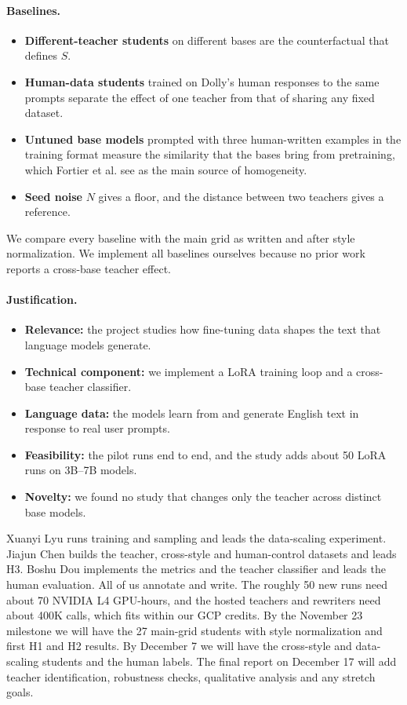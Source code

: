 \documentclass{article}
\begin{document}
\paragraph{Baselines.}
\begin{itemize}
    \item \textbf{Different-teacher students} on different bases are the counterfactual that defines $S$.
    \item \textbf{Human-data students} trained on Dolly's human responses to the same prompts separate the effect of one teacher from that of sharing any fixed dataset.
    \item \textbf{Untuned base models} prompted with three human-written examples in the training format measure the similarity that the bases bring from pretraining, which Fortier et al. see as the main source of homogeneity.
    \item \textbf{Seed noise} $N$ gives a floor, and the distance between two teachers gives a reference.
\end{itemize}
We compare every baseline with the main grid as written and after style normalization. We implement all baselines ourselves because no prior work reports a cross-base teacher effect.

\paragraph{Justification.}
\begin{itemize}
    \item \textbf{Relevance:} the project studies how fine-tuning data shapes the text that language models generate.
    \item \textbf{Technical component:} we implement a LoRA training loop and a cross-base teacher classifier.
    \item \textbf{Language data:} the models learn from and generate English text in response to real user prompts.
    \item \textbf{Feasibility:} the pilot runs end to end, and the study adds about 50 LoRA runs on 3B--7B models.
    \item \textbf{Novelty:} we found no study that changes only the teacher across distinct base models.
\end{itemize}
Xuanyi Lyu runs training and sampling and leads the data-scaling experiment. Jiajun Chen builds the teacher, cross-style and human-control datasets and leads H3. Boshu Dou implements the metrics and the teacher classifier and leads the human evaluation. All of us annotate and write. The roughly 50 new runs need about 70 NVIDIA L4 GPU-hours, and the hosted teachers and rewriters need about 400K calls, which fits within our GCP credits. By the November 23 milestone we will have the 27 main-grid students with style normalization and first H1 and H2 results. By December 7 we will have the cross-style and data-scaling students and the human labels. The final report on December 17 will add teacher identification, robustness checks, qualitative analysis and any stretch goals.

\clearpage
\begingroup\small


\endgroup
\end{document}
